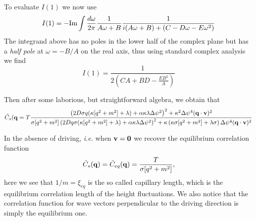 To evaluate $I(1)$ we now use
\begin{equation}
I(1) = -{\rm Im} \int \frac{d\omega}{2\pi}\frac{1}{A\omega +B} \frac{1}{i(A\omega + B) + (C-D\omega-E \omega^2)}
\end{equation}
The integrand above has no poles in the lower half of the complex plane but has a {\em half pole} at $\omega=-B/A$ on the real axis, thus using standard complex analysis we find
\begin{equation}
I(1) = \frac{1}{2(CA + BD - \frac{EB^2}{A})}
\end{equation}

Then after some laborious, but straightforward algebra, we obtain that 
\begin{align}
\tilde C_s({\bf q} = T \frac{\left(2 D\sigma q(\kappa[q^2+m^2]+\lambda)+\alpha\kappa\lambda\Delta\psi^2\right)^2 +\kappa^2 \Delta\psi^4 ({\bf q}\cdot{\bf v})^2}{\sigma[q^2+m^2]\left(2D q\sigma (\kappa[q^2+m^2]+\lambda)+\alpha \kappa\lambda \Delta\psi^2\right)^2 + \kappa\left(\kappa\sigma[q^2+m^2] + \lambda\sigma\right)\Delta\psi^4({\bf q}\cdot{\bf v})^2}\label{eqmaind}
\end{align}

In the absence of driving, {\em i.e.} when ${\bf v}={\bf 0}$ we recover the equilibrium correlation function
\begin{equation}
    \tilde C_s({\bf q})= \tilde C_{eq}({\bf q})= \frac{T}{\sigma[q^2+m^2]},
\end{equation} 
here we see that  $1/m= \xi_{eq}$ is the so called capillary length, which is the equilibrium correlation length of the height fluctuations. We also notice that the correlation function for wave vectors perpendicular to the driving direction is simply the equilibrium one.

